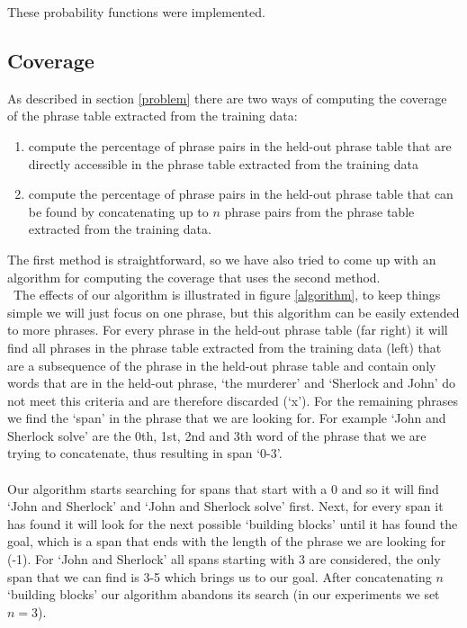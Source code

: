 \documentclass[11pt]{article}
\begin{document}
These probability functions were implemented.

\subsection{Coverage}
\label{implem2}
As described in section \ref{problem} there are two ways of computing the coverage of the phrase table extracted from the training data:
\begin{enumerate}
\item compute the percentage of phrase pairs in the held-out phrase table that are directly accessible in the phrase table extracted from the training data
\item compute the percentage of phrase pairs in the held-out phrase table that can be found by concatenating up to $n$ phrase pairs from the phrase table extracted from the training data.
\end{enumerate}
The first method is straightforward, so we have also tried to come up with an algorithm for computing the coverage that uses the second method. \\\
The effects of our algorithm is illustrated in figure \ref{algorithm}, to keep things simple we will just focus on one phrase, but this algorithm can be easily extended to more phrases. For every phrase in the held-out phrase table (far right) it will find all phrases in the phrase table extracted from the training data (left) that are a subsequence of the phrase in the held-out phrase table and contain only words that are in the held-out phrase, `the murderer' and `Sherlock and John' do not meet this criteria and are therefore discarded (`x'). For the remaining phrases we find the `span' in the phrase that we are looking for. For example `John and Sherlock solve' are the 0th, 1st, 2nd and 3th word of the phrase that we are trying to concatenate, thus resulting in span `0-3'. \\\\
Our algorithm starts searching for spans that start with a 0 and so it will find `John and Sherlock' and `John and Sherlock solve' first. Next, for every span it has found it will look for the next possible `building blocks' until it has found the goal, which is a span that ends with the length of the phrase we are looking for (-1). For  `John and Sherlock' all spans starting with 3 are considered, the only span that we can find is 3-5 which brings us to our goal. After concatenating $n$ `building blocks' our algorithm abandons its search (in our experiments we set $n=3$).
\end{document}
